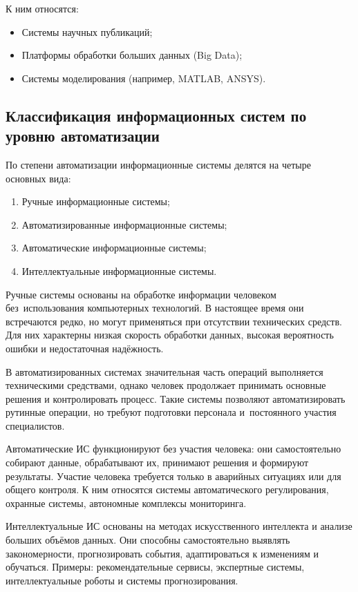 \documentclass{ou}
\begin{document}
К ним относятся:
\begin{itemize}[label=-, leftmargin=0em, itemindent=3.35em, nosep]
\item Системы научных публикаций;
\item Платформы обработки больших данных (Big Data);
\item Системы моделирования (например, MATLAB, ANSYS).
\end{itemize}
\subsection{Классификация информационных систем по уровню автоматизации}
По степени автоматизации информационные системы делятся на четыре основных вида:
\begin{enumerate}[leftmargin=0em, itemindent=3.75em, nosep, label=\arabic*)]
\item Ручные информационные системы;
\item Автоматизированные информационные системы;
\item Автоматические информационные системы;
\item Интеллектуальные информационные системы.
\end{enumerate}

Ручные системы основаны на обработке информации человеком без~использования компьютерных технологий. В настоящее время они встречаются редко, но могут применяться при отсутствии технических средств. Для них характерны низкая скорость обработки данных, высокая вероятность ошибки и недостаточная надёжность.

В автоматизированных системах значительная часть операций выполняется техническими средствами, однако человек продолжает принимать основные решения и контролировать процесс. Такие системы позволяют автоматизировать рутинные операции, но требуют подготовки персонала и~постоянного участия специалистов.

Автоматические ИС функционируют без участия человека: они самостоятельно собирают данные, обрабатывают их, принимают решения и формируют результаты. Участие человека требуется только в аварийных ситуациях или для общего контроля. К ним относятся системы автоматического регулирования, охранные системы, автономные комплексы мониторинга.

Интеллектуальные ИС основаны на методах искусственного интеллекта и анализе больших объёмов данных. Они способны самостоятельно выявлять закономерности, прогнозировать события, адаптироваться к изменениям и обучаться.
Примеры: рекомендательные сервисы, экспертные системы, интеллектуальные роботы и системы прогнозирования.
\end{document}
